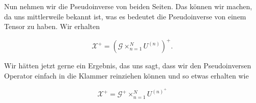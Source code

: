 Nun nehmen wir die Pseudoinverse von beiden Seiten. Das können wir machen, da uns mittlerweile bekannt ist, was es bedeutet die Pseudoinverse von einem Tensor zu haben. Wir erhalten

\begin{equation}
\pmb{\mathscr{X}}^{+} = (\pmb{\mathscr{G}} \times_{n=1}^{N} U^{ (n) })^+.
\end{equation}

Wir hätten jetzt gerne ein Ergebnis, das uns sagt, dass wir den Pseudoinversen Operator einfach in die Klammer reinziehen können und so etwas erhalten wie

\begin{equation} \label{eq:pinv}
\pmb{\mathscr{X}}^{+} = \pmb{\mathscr{G}}^{+} \times_{n=1}^{N} U^{ (n) ^{+} }
\end{equation}

